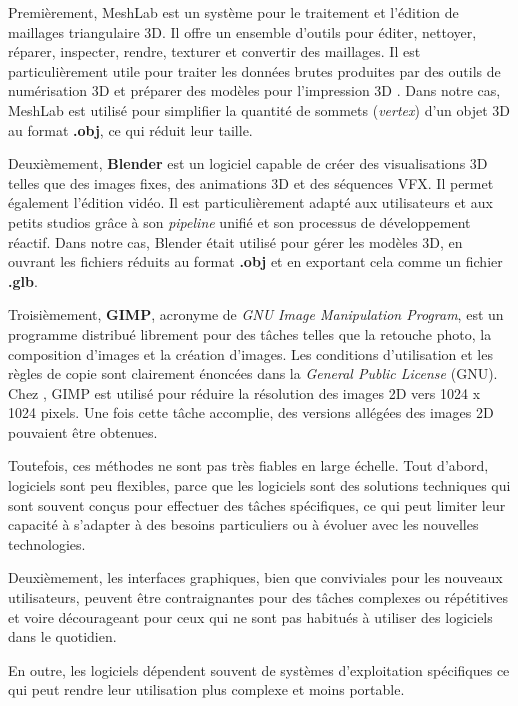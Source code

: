             Premièrement, MeshLab est un système \textit{\opso} pour le traitement et l'édition de maillages triangulaire 3D. Il offre un ensemble d'outils pour éditer, nettoyer, réparer, inspecter, rendre, texturer et convertir des maillages. Il est particulièrement utile pour traiter les données brutes produites par des outils de numérisation 3D et préparer des modèles pour l'impression 3D . Dans notre cas, MeshLab est utilisé pour simplifier la quantité de sommets (\textit{vertex}) d'un objet 3D au format \textbf{.obj}, ce qui réduit leur taille.
            
            Deuxièmement, \textbf{Blender} est un logiciel capable de créer des visualisations 3D telles que des images fixes, des animations 3D et des séquences VFX. Il permet également l'édition vidéo. Il est particulièrement adapté aux utilisateurs et aux petits studios grâce à son \textit{pipeline} unifié et son processus de développement réactif. Dans notre cas, Blender était utilisé pour gérer les modèles 3D, en ouvrant les fichiers réduits au format \textbf{.obj} et en exportant cela comme un fichier \textbf{.glb}.
            
            Troisièmement, \textbf{GIMP}, acronyme de \textit{GNU Image Manipulation Program}, est un programme distribué librement pour des tâches telles que la retouche photo, la composition d'images et la création d'images. Les conditions d'utilisation et les règles de copie sont clairement énoncées dans la \textit{General Public License} (GNU). Chez \dsc, GIMP est utilisé pour réduire la résolution des images 2D vers 1024 x 1024 pixels. Une fois cette tâche accomplie, des versions allégées des images 2D pouvaient être obtenues.
            
            Toutefois, ces méthodes ne sont pas très fiables en large échelle. Tout d'abord, logiciels sont peu flexibles, parce que les logiciels sont des solutions techniques qui sont souvent conçus pour effectuer des tâches spécifiques, ce qui peut limiter leur capacité à s'adapter à des besoins particuliers ou à évoluer avec les nouvelles technologies. 

            Deuxièmement, les interfaces graphiques, bien que conviviales pour les nouveaux utilisateurs, peuvent être contraignantes pour des tâches complexes ou répétitives et voire décourageant pour ceux qui ne sont pas habitués à utiliser des logiciels dans le quotidien.

            En outre, les logiciels dépendent souvent de systèmes d'exploitation spécifiques ce qui peut rendre leur utilisation plus complexe et moins portable.

